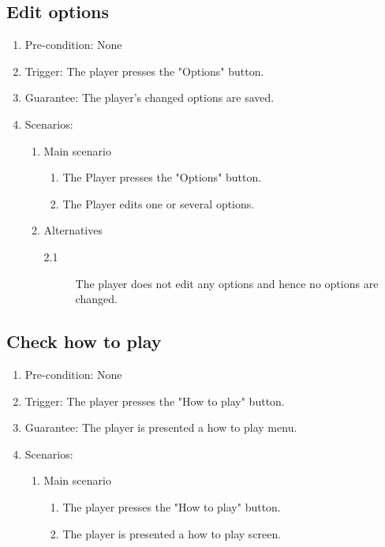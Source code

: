\documentclass[a4paper,twoside,11pt]{article}
\begin{document}
\subsection*{Edit options}
\begin{enumerate}
\item Pre-condition: None
\item Trigger: The player presses the "Options" button.
\item Guarantee: The player's changed options are saved.
\item Scenarios: 
	\begin{enumerate}
	\item Main scenario
		\begin{enumerate}[1)]
		\item The Player presses the "Options" button.
		\item The Player edits one or several options.
		\end{enumerate}
	\item Alternatives
		\begin{description}
		\item[2.1] The player does not edit any options and hence no 			options are changed.
		\end{description}
	\end{enumerate}
\end{enumerate}
\subsection*{Check how to play}
\begin{enumerate}
\item Pre-condition: None
\item Trigger: The player presses the "How to play" button.
\item Guarantee: The player is presented a how to play menu.
\item Scenarios: 
	\begin{enumerate}
	\item Main scenario
		\begin{enumerate}[1)]
		\item The player presses the "How to play" button.
		\item The player is presented a how to play screen.
		\end{enumerate}
	\end{enumerate}
\end{enumerate}
\end{document}
